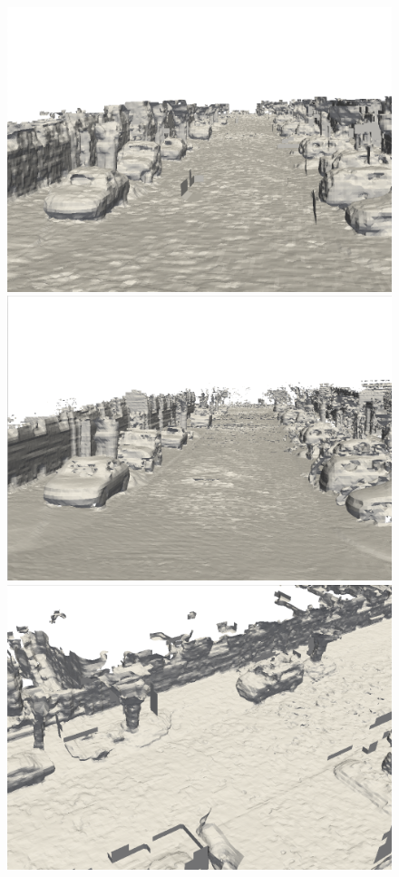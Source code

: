 \begin{figure}[htbp]
\begin{minipage}{0.5\linewidth}
		\includegraphics[width=1\linewidth]{figures/kitti_2_shine.png}
	\end{minipage}\hfill
	\begin{minipage}{0.5\linewidth}
		\centering
		\includegraphics[width=1\linewidth]{figures/kitti_2_vdb.png}
	\end{minipage}
    \vfill
	\begin{minipage}{0.5\linewidth}
		\centering
		\includegraphics[width=1\linewidth]{figures/kitti_3_shine.png}

\end{minipage}
\end{figure}
